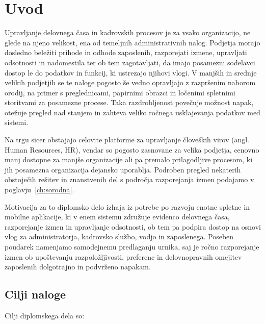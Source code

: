 \chapter{Uvod}
\label{ch:uvod}

Upravljanje delovnega časa in kadrovskih procesov je za vsako organizacijo, ne glede na njeno velikost, ena od temeljnih administrativnih nalog. Podjetja morajo dosledno beležiti prihode in odhode zaposlenih, razporejati izmene, upravljati odsotnosti in nadomestila ter ob tem zagotavljati, da imajo posamezni sodelavci dostop le do podatkov in funkcij, ki ustrezajo njihovi vlogi. V manjših in srednje velikih podjetjih se te naloge pogosto še vedno opravljajo z razpršenim naborom orodij, na primer s preglednicami, papirnimi obrazci in ločenimi spletnimi storitvami za posamezne procese. Taka razdrobljenost povečuje možnost napak, otežuje pregled nad stanjem in zahteva veliko ročnega usklajevanja podatkov med sistemi.

Na trgu sicer obstajajo celovite platforme za upravljanje človeških virov (angl. Human Resources, HR), vendar so pogosto zasnovane za velika podjetja, cenovno manj dostopne za manjše organizacije ali pa premalo prilagodljive procesom, ki jih posamezna organizacija dejansko uporablja. Podroben pregled nekaterih obstoječih rešitev in znanstvenih del s področja razporejanja izmen podajamo v poglavju~\ref{ch:sorodna}.

Motivacija za to diplomsko delo izhaja iz potrebe po razvoju enotne spletne in mobilne aplikacije, ki v enem sistemu združuje evidenco delovnega časa, razporejanje izmen in upravljanje odsotnosti, ob tem pa podpira dostop na osnovi vlog za administratorja, kadrovsko službo, vodjo in zaposlenega. Poseben poudarek namenjamo samodejnemu predlaganju urnika, saj je ročno razporejanje izmen ob upoštevanju razpoložljivosti, preferenc in delovnopravnih omejitev zaposlenih dolgotrajno in podvrženo napakam.

\section{Cilji naloge}
\label{sec:cilji}

Cilji diplomskega dela so:

